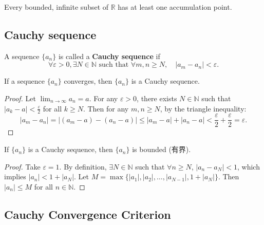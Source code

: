\documentclass[
	UTF-8,
	11pt, %
	a4paper, %
]{LegrandOrangeBook}
\begin{document}
    \begin{corollary}
    Every bounded, infinite subset of $\mathbb{R}$ has at least one accumulation point.
    \end{corollary}

    \newpage

    \subsection{Cauchy sequence}

    \begin{definition}
    A sequence $\{a_n\}$ is called a \textbf{Cauchy sequence} if 
    \[ \forall \varepsilon > 0, \exists N \in \mathbb{N} \text{ such that } \forall m, n \ge N, \quad |a_m - a_n| < \varepsilon. \]
    \end{definition}

    \begin{theorem}
    If a sequence $\{a_n\}$ converges, then $\{a_n\}$ is a Cauchy sequence.
    \end{theorem}

    \begin{proof}
    Let $\lim_{n \to \infty} a_n = a$. For any $\varepsilon > 0$, there exists $N \in \mathbb{N}$ such that $|a_k - a| < \frac{\varepsilon}{2}$ for all $k \ge N$.
    Then for any $m, n \ge N$, by the triangle inequality:
    \[ |a_m - a_n| = |(a_m - a) - (a_n - a)| \le |a_m - a| + |a_n - a| < \frac{\varepsilon}{2} + \frac{\varepsilon}{2} = \varepsilon. \]
    \end{proof}

    \begin{theorem}
    If $\{a_n\}$ is a Cauchy sequence, then $\{a_n\}$ is bounded (有界).
    \end{theorem}

    \begin{proof}
    Take $\varepsilon = 1$. By definition, $\exists N \in \mathbb{N}$ such that $\forall n \ge N$, $|a_n - a_N| < 1$, which implies $|a_n| < 1 + |a_N|$.
    Let $M = \max\{|a_1|, |a_2|, \dots, |a_{N-1}|, 1 + |a_N|\}$.
    Then $|a_n| \le M$ for all $n \in \mathbb{N}$.
    \end{proof}

    \subsection{Cauchy Convergence Criterion}
\end{document}
